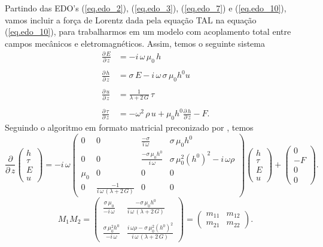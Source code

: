 Partindo das EDO's (\ref{eq.edo_2}), (\ref{eq.edo_3}), (\ref{eq.edo_7}) e (\ref{eq.edo_10}), vamos incluir a for\c{c}a de Lorentz dada pela equa\c{c}\~ao TAL na equa\c{c}\~ao (\ref{eq.edo_10}), para trabalharmos em um modelo com acoplamento total entre campos mec\^anicos e eletromagn\'eticos. Assim, temos o seguinte sistema
\begin{align*}
\frac{\partial\,E}{\partial\,z}&=-i\,\omega\,\mu_0\,h\\\\
\frac{\partial\,h}{\partial\,z}&=\sigma\,E-i\,\omega\,\sigma\,\mu_0h^0u\\\\
\frac{\partial\,u}{\partial\,z}&=\frac{1}{\lambda+2\,G}\,\tau\\\\
\frac{\partial\,\tau}{\partial\,z}&=-\omega^2\,\rho\,u+\mu_0h^0\frac{\partial\,h}{\partial\,z}-F.
\end{align*}
Seguindo o algoritmo em formato matricial preconizado por \cite{ursin-1983}, temos
\begin{equation}\label{eq.four_f_full_coupled_1D_model}
\frac{\partial}{\partial\,z}\begin{pmatrix}
h\\
\tau\\
E\\
u
\end{pmatrix}
=
-i\,\omega\begin{pmatrix}
0&0&\frac{-\sigma}{i\,\omega}&\sigma\,\mu_0h^0\\
0&0&\frac{-\sigma\,\mu_0h^0}{i\,\omega}&\sigma\,\mu_0^2(h^0)^2-i\,\omega\rho\\
\mu_0&0&0&0\\
0&\frac{-1}{i\,\omega\,(\lambda+2\,G)} &0&0
\end{pmatrix}
\begin{pmatrix}
h\\
\tau\\
E\\
u
\end{pmatrix}
+
\begin{pmatrix}
0\\
-F\\
0\\
0
\end{pmatrix}.
\end{equation}
\begin{equation*}
M_1M_2=\begin{pmatrix}
\frac{\sigma\,\mu_0}{-i\,\omega}&\frac{-\sigma\,\mu_0h^0}{i\,\omega\,(\lambda+2\,G)}\\\\
\frac{\sigma\,\mu_0^2h^0}{-i\,\omega}&\frac{i\,\omega\rho-\sigma\,\mu_0^2(h^0)^2}{i\,\omega\,(\lambda+2\,G)}
\end{pmatrix}
=\begin{pmatrix}
m_{11}&m_{12}\\
m_{21}&m_{22}
\end{pmatrix}.
\end{equation*}
